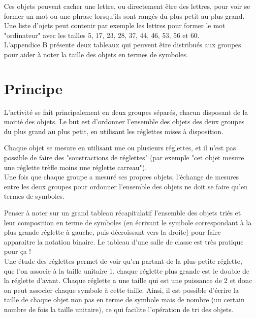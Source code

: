 \documentclass[a4paper,12pt]{scrartcl}
\begin{document}
Ces objets peuvent cacher une lettre, ou directement être des lettres, pour voir se former un mot ou une phrase lorsqu'ils sont rangés du plus petit au plus grand.
Une liste d'ojets peut contenir par exemple les lettres pour former le mot "ordinateur" avec les tailles 5, 17, 23, 28, 37, 44, 46, 53, 56 et 60.\\


L'appendice B présente deux tableaux qui peuvent être distribués aux groupes pour aider à noter la taille des objets en termes de symboles.



\section{Principe}

L'activité se fait principalement en deux groupes séparés, chacun disposant de la moitié des objets.
Le but est d'ordonner l'ensemble des objets des deux groupes du plus grand au plus petit, en utilisant les réglettes mises à disposition.

Chaque objet se mesure en utilisant une ou plusieurs réglettes, et il n'est pas possible de faire des "soustractions de réglettes" (par exemple "cet objet mesure une réglette trèfle moins une réglette carreau").\\


Une fois que chaque groupe a mesuré ses propres objets, l'échange de mesures entre les deux groupes pour ordonner l'ensemble des objets ne doit se faire qu'en termes de symboles.

Penser à noter sur un grand tableau récapitulatif l'ensemble des objets triés et leur composition en terme de symboles (en écrivant le symbole correspondant à la plus grande réglette à gauche, puis décroissant vers la droite) pour faire apparaitre la notation binaire. Le tableau d'une salle de classe est très pratique pour ça !\\


Une étude des réglettes permet de voir qu'en partant de la plus petite réglette, que l'on associe à la taille unitaire 1, chaque réglette plus grande est le double de la réglette d'avant. 
%
Chaque réglette a une taille qui est une puissance de 2 et donc on peut associer chaque symbole à cette taille. Ainsi, il est possible d'écrire la taille de chaque objet non pas en terme de symbole mais de nombre (un certain nombre de fois la taille unitaire), ce qui facilite l'opération de tri des objets.
\end{document}
